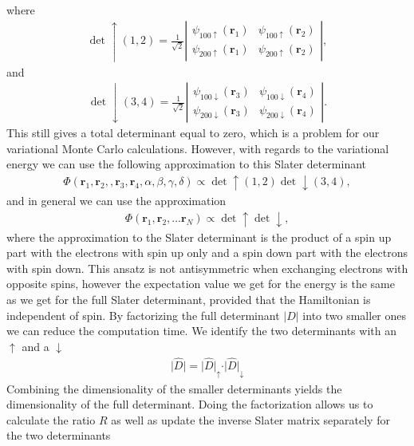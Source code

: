 \documentclass[../main.tex]{subfiles}
\begin{document}
where
\begin{align}
    \det\uparrow(1,2)=\frac{1}{\sqrt{2}}\left| \begin{array}{cc} \psi_{100\uparrow}(\mathbf{r}_1)& \psi_{100\uparrow}(\mathbf{r}_2)\\
    \psi_{200\uparrow}(\mathbf{r}_1)& \psi_{200\uparrow}(\mathbf{r}_2) \end{array} \right|,
\end{align}
and 
\begin{align}
    \det\downarrow(3,4)=\frac{1}{\sqrt{2}}\left| \begin{array}{cc} \psi_{100\downarrow}(\mathbf{r}_3)& \psi_{100\downarrow}(\mathbf{r}_4)\\
    \psi_{200\downarrow}(\mathbf{r}_3)& \psi_{200\downarrow}(\mathbf{r}_4) \end{array} \right|.
\end{align}
This still gives a total determinant equal to zero, which is a problem for our variational Monte Carlo calculations. However, with regards to the variational energy we can use the following approximation to this Slater determinant\cite{Kalos} 
\begin{align}
    \Phi(\mathbf{r}_1,\mathbf{r}_2,,\mathbf{r}_3,\mathbf{r}_4, \alpha,\beta,\gamma,\delta) \propto \det\uparrow(1,2)\det\downarrow(3,4), 
\end{align}
and in general we can use the approximation 
\begin{align}
    \Phi(\mathbf{r}_1,\mathbf{r}_2,\dots \mathbf{r}_N) \propto \det\uparrow \det\downarrow, 
\end{align}
where the approximation to the Slater determinant is the product of a spin up part with the electrons with spin up only and a spin down part with the electrons with spin down. This ansatz is not antisymmetric when exchanging electrons with opposite spins, however the expectation value we get for the energy is the same as we get for the full Slater determinant, provided that the Hamiltonian is independent of spin. By factorizing the full determinant $\vert\hat{D}\vert$ into two smaller ones we can reduce the computation time. We identify the two determinants with an $\uparrow$ and a $\downarrow$
\begin{align}
    \vert\hat{D}\vert = \vert\hat{D}\vert_\uparrow\cdot \vert\hat{D}\vert_\downarrow
\end{align}
Combining the dimensionality of the smaller determinants yields the dimensionality of the full determinant. Doing the factorization allows us to calculate the ratio $R$ as well as update the inverse Slater matrix separately for the two determinants 
\end{document}
